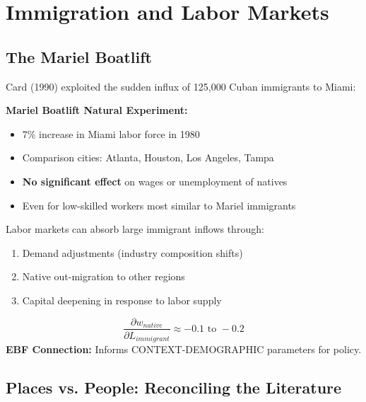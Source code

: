 \section{Immigration and Labor Markets}

\subsection{The Mariel Boatlift}

Card (1990) exploited the sudden influx of 125,000 Cuban immigrants to Miami:

\begin{tcolorbox}[colback=green!5!white, colframe=green!75!black]
\textbf{Mariel Boatlift Natural Experiment:}
\begin{itemize}
    \item 7\% increase in Miami labor force in 1980
    \item Comparison cities: Atlanta, Houston, Los Angeles, Tampa
    \item \textbf{No significant effect} on wages or unemployment of natives
    \item Even for low-skilled workers most similar to Mariel immigrants
\end{itemize}
\end{tcolorbox}

\begin{axiom}
\label{ax:dc3}
Labor markets can absorb large immigrant inflows through:
\begin{enumerate}
    \item Demand adjustments (industry composition shifts)
    \item Native out-migration to other regions
    \item Capital deepening in response to labor supply
\end{enumerate}
\begin{equation}
\frac{\partial w_{native}}{\partial L_{immigrant}} \approx -0.1 \text{ to } -0.2
\end{equation}
\textbf{EBF Connection:} Informs CONTEXT-DEMOGRAPHIC parameters for policy.
\end{axiom}

\subsection{Places vs. People: Reconciling the Literature}

